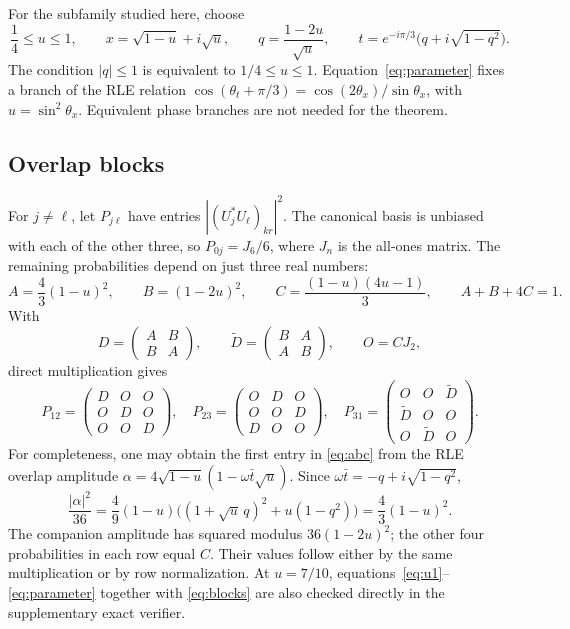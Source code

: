 \documentclass[11pt,a4paper]{article}
\theoremstyle{remark}
\begin{document}
For the subfamily studied here, choose
\begin{equation}\label{eq:parameter}
 \frac14\le u\le1,\qquad
 x=\sqrt{1-u}+i\sqrt u,\qquad
 q=\frac{1-2u}{\sqrt u},\qquad
 t=e^{-i\pi/3}\bigl(q+i\sqrt{1-q^2}\bigr).
\end{equation}
The condition $|q|\le1$ is equivalent to $1/4\le u\le1$. Equation~\eqref{eq:parameter} fixes a branch of the RLE relation $\cos(\theta_t+\pi/3)=\cos(2\theta_x)/\sin\theta_x$, with $u=\sin^2\theta_x$. Equivalent phase branches are not needed for the theorem.

\subsection{Overlap blocks}
For $j\ne\ell$, let $P_{j\ell}$ have entries $|(U_j^*U_\ell)_{kr}|^2$. The canonical basis is unbiased with each of the other three, so $P_{0j}=J_6/6$, where $J_n$ is the all-ones matrix.
The remaining probabilities depend on just three real numbers:
\begin{equation}\label{eq:abc}
 A=\frac43(1-u)^2,\qquad B=(1-2u)^2,\qquad
 C=\frac{(1-u)(4u-1)}3,\qquad A+B+4C=1.
\end{equation}
With
\[
 D=\begin{pmatrix}A&B\\B&A\end{pmatrix},\qquad
 \widetilde D=\begin{pmatrix}B&A\\A&B\end{pmatrix},\qquad O=CJ_2,
\]
direct multiplication gives
\begin{equation}\label{eq:blocks}
 P_{12}=\begin{pmatrix}D&O&O\\O&D&O\\O&O&D\end{pmatrix},\quad
 P_{23}=\begin{pmatrix}O&D&O\\O&O&D\\D&O&O\end{pmatrix},\quad
 P_{31}=\begin{pmatrix}O&O&\widetilde D\\\widetilde D&O&O\\O&\widetilde D&O\end{pmatrix}.
\end{equation}
For completeness, one may obtain the first entry in \eqref{eq:abc} from the RLE overlap amplitude $\alpha=4\sqrt{1-u}(1-\omega\bar t\sqrt u)$. Since $\omega\bar t=-q+i\sqrt{1-q^2}$,
\[
 \frac{|\alpha|^2}{36}
 =\frac49(1-u)\bigl((1+\sqrt u\,q)^2+u(1-q^2)\bigr)
 =\frac43(1-u)^2.
\]
The companion amplitude has squared modulus $36(1-2u)^2$; the other four probabilities in each row equal $C$. Their values follow either by the same multiplication or by row normalization. At $u=7/10$, equations~\eqref{eq:u1}--\eqref{eq:parameter} together with \eqref{eq:blocks} are also checked directly in the supplementary exact verifier.
\end{document}
